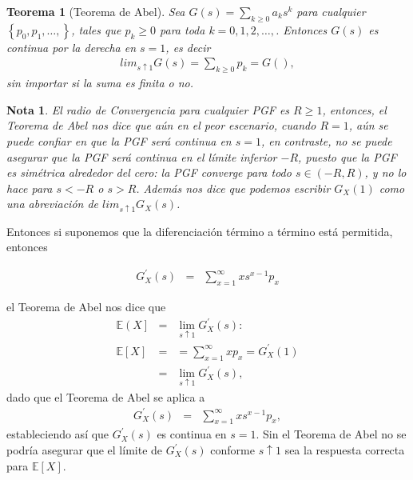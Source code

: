 \documentclass{article}
\newtheorem{Teo}{Teorema}[section]
\newtheorem{Note}{Nota}[section]
\newcommand{\esp}{\mathbb{E}}
\numberwithin{equation}{section}
\begin{document}
\begin{Teo}[Teorema de Abel]
Sea $G\left(s\right)=\sum_{k\geq0}a_{k}s^{k}$ para cualquier $\left\{p_{0},p_{1},\ldots,\right\}$, tales que $p_{k}\geq0$ para toda $k=0,1,2,\ldots,$. Entonces $G\left(s\right)$ es continua por la derecha en $s=1$, es decir
\begin{eqnarray*}
lim_{s\uparrow1}G\left(s\right)=\sum_{k\geq0}p_{k}=G\left(\right),
\end{eqnarray*}
sin importar si la suma es finita o no.
\end{Teo}
\begin{Note}
El radio de Convergencia para cualquier PGF es $R\geq1$, entonces, el Teorema de Abel nos dice que a\'un en el peor escenario, cuando $R=1$, a\'un se puede confiar en que la PGF ser\'a continua en $s=1$, en contraste, no se puede asegurar que la PGF ser\'a continua en el l\'imite inferior $-R$, puesto que la PGF es sim\'etrica alrededor del cero: la PGF converge para todo $s\in\left(-R,R\right)$, y no lo hace para $s<-R$ o $s>R$. Adem\'as nos dice que podemos escribir $G_{X}\left(1\right)$ como una abreviaci\'on de $lim_{s\uparrow1}G_{X}\left(s\right)$.
\end{Note}

Entonces si suponemos que la diferenciaci\'on t\'ermino a t\'ermino est\'a permitida, entonces

\begin{eqnarray*}
G_{X}^{'}\left(s\right)&=&\sum_{x=1}^{\infty}xs^{x-1}p_{x}
\end{eqnarray*}

el Teorema de Abel nos dice que
\begin{eqnarray*}
\esp\left(X\right]&=&\lim_{s\uparrow1}G_{X}^{'}\left(s\right):\\
\esp\left[X\right]&=&=\sum_{x=1}^{\infty}xp_{x}=G_{X}^{'}\left(1\right)\\
&=&\lim_{s\uparrow1}G_{X}^{'}\left(s\right),
\end{eqnarray*}
dado que el Teorema de Abel se aplica a
\begin{eqnarray*}
G_{X}^{'}\left(s\right)&=&\sum_{x=1}^{\infty}xs^{x-1}p_{x},
\end{eqnarray*}
estableciendo as\'i que $G_{X}^{'}\left(s\right)$ es continua en $s=1$. Sin el Teorema de Abel no se podr\'ia asegurar que el l\'imite de $G_{X}^{'}\left(s\right)$ conforme $s\uparrow1$ sea la respuesta correcta para $\esp\left[X\right]$.
\end{document}

